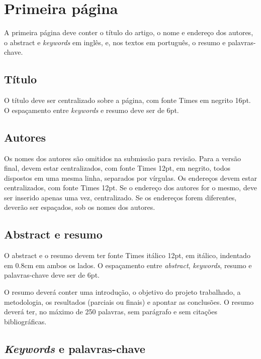 \documentclass[12pt]{article}
\begin{document}
\section{Primeira página}

A primeira página deve conter o título do artigo, o nome e endereço
dos autores, o abstract e \textit{keywords} em inglês, e, nos textos
em português, o resumo e palavras-chave.

\subsection{Título}
\label{sec:titulo}

O título deve ser centralizado sobre a página, com fonte
Times em negrito 16pt. O espaçamento entre \textit{keywords} e resumo
deve ser de 6pt.

\subsection{Autores}
\label{sec:autores}

Os nomes dos autores são omitidos na submissão para revisão. Para a
versão final, devem estar centralizados, com fonte Times 12pt, em
negrito, todos dispostos em uma mesma linha, separados por vírgulas.
Os endereços devem estar centralizados, com fonte Times 12pt. Se o
endereço dos autores for o mesmo, deve ser inserido apenas uma vez,
centralizado. Se os endereços forem diferentes, deverão ser espaçados,
sob os nomes dos autores.

\subsection{Abstract e resumo}
\label{sec:abstract-e-resumo}

O abstract e o resumo devem ter fonte Times itálico 12pt, em itálico,
indentado em 0.8cm em ambos os lados. O espaçamento entre
\textit{abstract}, \textit{keywords}, resumo e palavras-chave deve ser
de 6pt.

O resumo deverá conter uma introdução, o objetivo do projeto
trabalhado, a metodologia, os resultados (parciais ou finais) e
apontar as conclusões. O resumo deverá ter, no máximo de 250 palavras,
sem parágrafo e sem citações bibliográficas.

\subsection{\textit{Keywords} e palavras-chave}
\label{sec:keywords-e-palavras}
\end{document}
